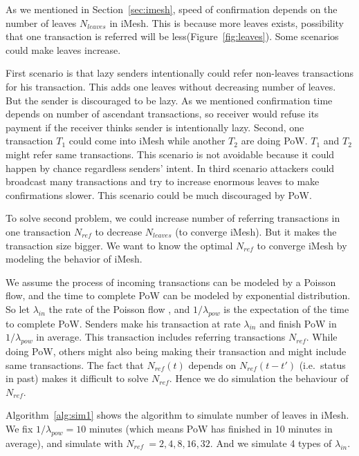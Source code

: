 \documentclass[a4paper,10pt,twocolumn]{article}
\begin{document}
As we mentioned in Section~\ref{sec:imesh}, speed of confirmation
depends on the number of leaves \( N_{leaves} \) in iMesh. This is because more leaves exists,
possibility  that one transaction is referred  will be less(Figure~\ref{fig:leaves}).
Some scenarios could make leaves increase.

First scenario is that lazy senders intentionally could refer non-leaves transactions for his transaction.
This adds one leaves without decreasing number of leaves. But the sender is discouraged to be lazy.
As we mentioned confirmation time depends on number of ascendant transactions,
so receiver would refuse its payment if the receiver thinks sender is intentionally lazy.
Second, one transaction \(T_1\) could come into iMesh while another \(T_2\) are doing PoW.
\(T_1\) and \(T_2\) might refer same transactions.
This scenario is not avoidable because it could happen by chance regardless senders' intent.
In third scenario attackers could broadcast many transactions and try to increase enormous leaves to make confirmations slower.
This scenario could be much discouraged by PoW.

To solve second problem,
we could increase number of referring transactions in one transaction \( N_{ref} \) 
to decrease \( N _{leaves} \) (to converge iMesh). But it makes the transaction size bigger.
We want to know the optimal  \( N_{ref} \)  to converge iMesh by modeling the behavior of iMesh.

We assume the process of incoming transactions can be modeled by a Poisson flow, and the time to  complete PoW can be modeled by exponential distribution.
So let \(\lambda_{in}\) the rate of the Poisson flow , and \(1 / \lambda_{pow}\) is the expectation of the time to complete PoW.
Senders make his transaction at rate \(\lambda_{in}\)  and finish PoW in  \(1/\lambda_{pow}\) in average.
This transaction includes referring transactions \( N_{ref}\).
While doing PoW, others might also being making their transaction and might include same transactions.
The fact that  \( N_{ref} (t) \)  depends on  \( N_{ref} (t-t')\) (i.e.\ status in past) makes it difficult 
to solve \( N_{ref}\). Hence we do simulation the behaviour of \( N_{ref}\).

Algorithm~\ref{alg:sim1}  shows the algorithm to simulate number of leaves in iMesh.
We fix  \(1 / \lambda_{pow} = 10 \) minutes (which means PoW has finished in 10 minutes
in average), and simulate with \(N_{ref}\ = 2, 4, 8, 16, 32 \).
And we simulate 4 types of  \(\lambda_{in} \).
\end{document}
